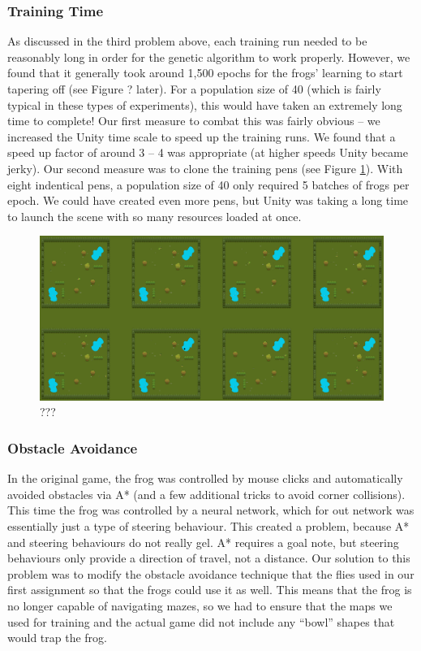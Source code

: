 \subsubsection{Training Time}
As discussed in the third problem above, each training run needed to be reasonably long in order for the genetic algorithm to work properly. However, we found that it generally took around 1,500 epochs for the frogs' learning to start tapering off (see Figure ? later). For a population size of 40 (which is fairly typical in these types of experiments), this would have taken an extremely long time to complete! Our first measure to combat this was fairly obvious -- we increased the Unity time scale to speed up the training runs. We found that a speed up factor of around 3 -- 4 was appropriate (at higher speeds Unity became jerky). Our second measure was to clone the training pens (see Figure \ref{fig:TrainingPens}). With eight indentical pens, a population size of 40 only required 5 batches of frogs per epoch. We could have created even more pens, but Unity was taking a long time to launch the scene with so many resources loaded at once.

\begin{figure}[!htbp]
    \centering
    \includegraphics[scale=0.3]{Figs/TrainingPens.png}
    \caption{???}
    \label{fig:TrainingPens}
\end{figure}

\subsubsection{Obstacle Avoidance}
In the original game, the frog was controlled by mouse clicks and automatically avoided obstacles via A* (and a few additional tricks to avoid corner collisions). This time the frog was controlled by a neural network, which for out network was essentially just a type of steering behaviour. This created a problem, because A* and steering behaviours do not really gel. A* requires a goal note, but steering behaviours only provide a direction of travel, not a distance. Our solution to this problem was to modify the obstacle avoidance technique that the flies used in our first assignment so that the frogs could use it as well. This means that the frog is no longer capable of navigating mazes, so we had to ensure that the maps we used for training and the actual game did not include any ``bowl'' shapes that would trap the frog.

